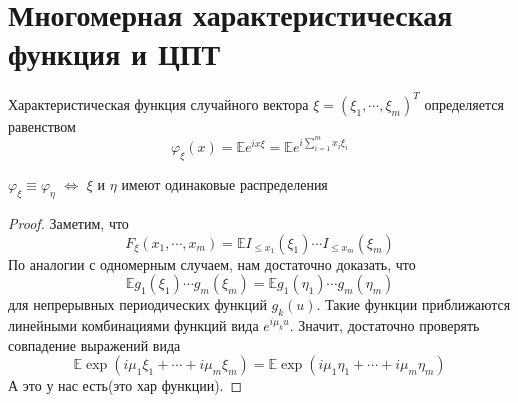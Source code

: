 \clearpage

\section{Многомерная характеристическая функция и ЦПТ}

\begin{definition}
$\textit{Характеристическая функция случайного вектора}$ $\xi = \left(\xi_1, \cdots, \xi_m\right) ^ T$ определяется равенством
\[
    \varphi_{\xi}\left(x\right) =  \mathbb{E}  e ^ {i  x \xi } = \mathbb{E} e ^ {i \sum_{i = 1}^{m} x_i \xi_i}
\]

\end{definition}

\begin{advice}
$\varphi_{\xi} \equiv \varphi_\eta$ $\Leftrightarrow$ $\xi$ и $\eta$ имеют одинаковые распределения
\end{advice}
\begin{proof}
Заметим, что
\[
    F_{\xi}\left(x_1, \cdots, x_m\right) =  \mathbb{E}  I_{\leq x_1}\left(\xi_1\right) \cdots I_{\leq x_m}\left(\xi_m\right)
\]
По аналогии с одномерным случаем, нам достаточно доказать, что 
\[
     \mathbb{E}  g_1 \left(\xi_1\right) \cdots g_m\left(\xi_m\right) =  \mathbb{E}  g_1 \left(\eta_1\right) \cdots g_m \left(\eta_m\right)
\]
для непрерывных периодических функций $g_k\left(u\right)$. Такие функции приближаются линейными комбинациями функций вида $e ^ {i \mu_k u}$. Значит, достаточно проверять совпадение выражений вида
\[
     \mathbb{E}  \exp \left(i \mu_1 \xi_1 + \cdots + i \mu_m \xi_m\right) =  \mathbb{E}  \exp \left(i \mu_1 \eta_1 + \cdots + i \mu_m \eta_m\right)
\]
А это у нас есть(это хар функции).
\end{proof}

